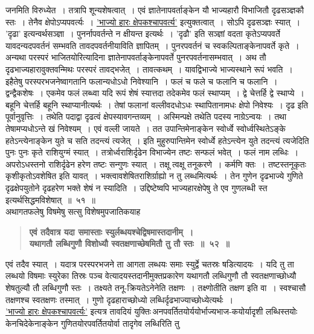 \documentclass[11pt, openany]{book}
\begin{document}
\newpage

\begin{sloppypar}
\noindent जनमिति विरुध्येत~। तत्रापि शून्यशेषत्वात्~। एवं ज्ञातेनापवर्ताङ्केन यौ भाज्यहारौ विभाजितौ दृढसञ्ज्ञकौ स्तः~। तेनैव क्षेपोऽप्यपवर्त्यः~। \hyperref[5.50]{'भाज्यो हारः क्षेपकश्चापवर्त्य'} इत्युक्तत्वात्~। सोऽपि दृढसञ्ज्ञः स्यात्~। 'दृढा' इत्यन्वर्थसञ्ज्ञा~। पुनर्नापवर्तन्ते न क्षीयन्त इत्यर्थः~। 'दृढौ' इति सञ्ज्ञां वदता कृतेऽप्यपवर्ते यावदन्यदपवर्तनं सम्भवति तावदपवर्तनीयाविति ज्ञापितम्~। पुनरपवर्तनं च स्वकल्पिताङ्केनापवर्ते कृते~। अन्यथा परस्परं भाजितयोरित्यादिना ज्ञातेनापवर्ताङ्केनापवर्ते पुनरपवर्तनासम्भवात्~। अथ तौ दृढभाज्यहारावुक्तवन्मिथः परस्परं तावद्भजेत्~। तावत्कथम्~। यावद्विभाज्ये भाज्यस्थाने रूपं भवति~। इहैतेषु परस्परभजनेष्वागतानि फलान्यधोऽधो निवेश्यानि~। फलं च फले च फलानि च फलानि~। द्वन्द्वैकशेषः~। एकमेव फलं लब्ध्वा यदि रूपं शेषं स्यात्तदा तदेकमेव फलं स्थाप्यम्~। द्वे चेत्तर्हि द्वे स्थाप्ये~। बहूनि चेत्तर्हि बहूनि स्थाप्यानीत्यर्थः~। तेषां फलानां वल्लीवदधोऽधः स्थापितानामधः क्षेपो निवेश्यः~। दृढ इति पूर्वानुवृत्तिः~। तथेति पदाद्वा दृढत्वं क्षेपस्यावगन्तव्यम्~। अस्मिन्पक्षे तथेति पदस्य नाग्रेऽन्वयः~। तथा तेषामप्यधोऽन्ते खं निवेश्यम्~। एवं वल्ली जायते~। तत उपान्तिमेनाङ्केन स्वोर्ध्वे स्वोर्ध्वस्थितेऽङ्के हतेऽन्त्येनाङ्केन युते च सति तदन्त्यं त्यजेत्~। इति मुहुरुपान्तिमेन स्वोर्ध्वे हतेऽन्त्येन युते तदन्त्यं त्यजेदिति पुनः पुनः कृते राशियुग्मं स्यात्~। तत्रोर्ध्वराशिर्दृढेन विभाज्येन तष्टः सन्फलं भवेत्~। फलं नाम लब्धिः~। अपरोऽधस्तनो राशिर्दृढेन हरेण तष्टः सन्गुणः स्यात्~। तक्षू त्वक्षू तनूकरणे~। कर्मणि क्तः~। तष्टस्तनूकृतः कृशीकृतोऽवशेषित इति यावत्~। भक्त्वावशेषितराशिर्ग्राह्यो न तु लब्धमित्यर्थः~। तेन गुणेन दृढभाज्ये गुणिते दृढक्षेपयुतोने दृढहरेण भक्ते शेषं न स्यादिति~। उद्दिष्टेष्वपि भाज्यहारक्षेपेषु ते एव गुणलब्धी स्त इत्यर्थसिद्धमविशेषात्~॥~५१~॥\\

{\small अथागतफलेषु विषमेषु सत्सु विशेषमुपजातिकयाह\textendash }

 \label{5.52}
\begin{quote}
{\large \textbf{{\color{purple}एवं तदैवात्र यदा समास्ताः स्युर्लब्धयश्चेद्विषमास्तदानीम्~।\\
यथागतौ लब्धिगुणौ विशोध्यौ स्वतक्षणाच्छेषमितौ तु तौ स्तः~॥~५२~॥}}}
\end{quote}

एवं तदैव स्यात्~। यदात्र परस्परभजने ता आगता लब्धयः समाः स्युर्द्वे चतस्रः षडित्यादयः~। यदि तु ता लब्धयो विषमाः स्युरेका तिस्रः पञ्च वेत्यादयस्तदानीमुक्तप्रकारेण यथागतौ लब्धिगुणौ तौ स्वतक्षणाच्छोध्यौ शेषतुल्यौ तौ लब्धिगुणौ स्तः~। तक्ष्यते तनू-क्रियतेऽनेनेति तक्षणः~। तक्ष्णोतीति तक्षण इति वा~। स्वश्चासौ तक्षणश्च स्वतक्षणः तस्मात्~। गुणो दृढहाराच्छोध्यो लब्धिर्दृढभाज्याच्छोध्येत्यर्थः~।\\

\hyperref[5.50]{'भाज्यो हारः क्षेपकश्चापवर्त्यः'} इत्यत्र तावदियं युक्तिः\textendash \,अनपवर्तितयोर्ययोर्भाज्यभाज-कयोर्यादृशी लब्धिस्तयोः केनचिदेकेनाङ्केन गुणितयोरपवर्तितयोर्वा तादृगेव लब्धिरिति तु
\end{sloppypar}
\end{document}
